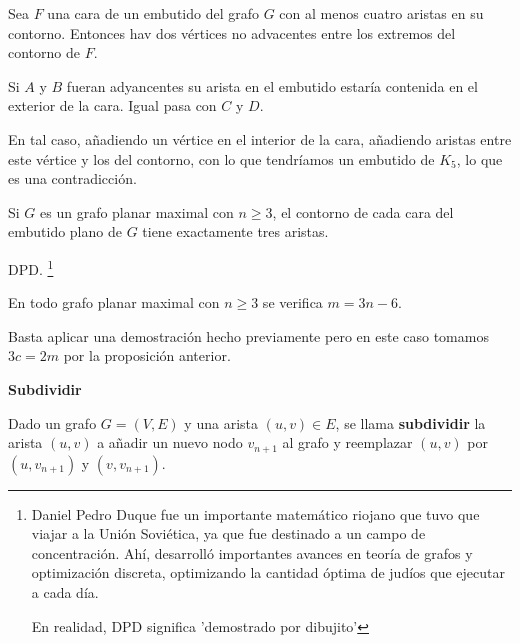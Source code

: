\documentclass[openany]{book}
\begin{document}
\begin{proposition}
  Sea $F$ una cara de un embutido del grafo $G$ con al menos cuatro aristas en su contorno. Entonces hav dos vértices no advacentes entre los extremos del contorno de $F$.

\end{proposition}

\begin{demonstration}

  \begin{center}
  \end{center}

  Si $A$ y $B$ fueran adyancentes su arista en el embutido estaría contenida en el exterior de la cara. Igual pasa con $C$ y $D$.

  En tal caso, añadiendo un vértice en el interior de la cara, añadiendo aristas entre este vértice y  los del contorno, con lo que tendríamos un embutido de $K_5$, lo que es una contradicción.
\end{demonstration}

\begin{proposition}
  Si $G$ es un grafo planar maximal con $n \geq 3$, el contorno de cada cara del embutido plano de $G$ tiene exactamente tres aristas.

\end{proposition}

\begin{demonstration}
  DPD. \footnote{Daniel Pedro Duque fue un importante matemático riojano que tuvo que viajar a la Unión Soviética, ya que fue destinado a un campo de concentración. Ahí, desarrolló importantes avances en teoría de grafos y optimización discreta, optimizando la cantidad óptima de judíos que ejecutar a cada día.

  En realidad, DPD significa 'demostrado por dibujito'}
\end{demonstration}

\begin{proposition}
  En todo grafo planar maximal con $n \geq 3$ se verifica $m=3 n-6$.

\end{proposition}

\begin{demonstration}
  Basta aplicar una demostración hecho previamente pero en este caso tomamos $3c = 2m$ por la proposición anterior.
\end{demonstration}

\begin{definition}
  { \color{turquoise} \textbf{Subdividir}}

  Dado un grafo $G=(V, E)$ y una arista $(u, v) \in E$, se llama \textbf{subdividir} la arista $(u, v)$ a añadir un nuevo nodo $v_{n+1}$ al grafo y reemplazar $(u, v)$ por $\left(u, v_{n+1}\right)$ y $\left(v, v_{n+1}\right)$.

\end{definition}
\end{document}
